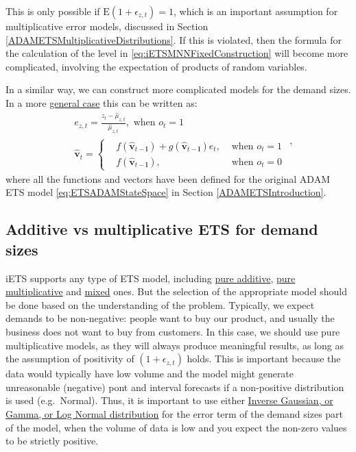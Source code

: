 \documentclass[
]{book}
\theoremstyle{definition}
\theoremstyle{definition}
\theoremstyle{definition}
\theoremstyle{definition}
\theoremstyle{remark}
\begin{document}
This is only possible if \(\mathrm{E}(1+\epsilon_{z,t})=1\), which is an important assumption for multiplicative error models, discussed in Section \ref{ADAMETSMultiplicativeDistributions}. If this is violated, then the formula for the calculation of the level in \eqref{eq:iETSMNNFixedConstruction} will become more complicated, involving the expectation of products of random variables.

In a similar way, we can construct more complicated models for the demand sizes. In a more \protect\hyperlink{ADAMETSIntroduction}{general case} this can be written as:
\begin{equation}
  \begin{aligned}
        & e_{z,t} = \frac{z_t - \hat{\mu}_{z,t}}{\hat{\mu}_{z,t}}, \text{ when } o_t=1 \\
        & \hat{\mathbf{v}}_{t} = 
            \left \lbrace \begin{aligned}
                & f(\hat{\mathbf{v}}_{t-\boldsymbol{l}}) + g(\hat{\mathbf{v}}_{t-\boldsymbol{l}}) e_t, & \text{ when } o_t=1 \\
                & f(\hat{\mathbf{v}}_{t-\boldsymbol{l}}) , & \text{ when } o_t=0
            \end{aligned} \right.
  \end{aligned},
  \label{eq:iETSADAMStateSpaceConstruction}
\end{equation}
where all the functions and vectors have been defined for the original ADAM ETS model \eqref{eq:ETSADAMStateSpace} in Section \ref{ADAMETSIntroduction}.

\hypertarget{additive-vs-multiplicative-ets-for-demand-sizes}{%
\subsection{Additive vs multiplicative ETS for demand sizes}\label{additive-vs-multiplicative-ets-for-demand-sizes}}

iETS supports any type of ETS model, including \protect\hyperlink{ADAMETSPureAdditive}{pure additive}, \protect\hyperlink{ADAMETSPureMultiplicative}{pure multiplicative} and \protect\hyperlink{ADAMETSMixedModels}{mixed} ones. But the selection of the appropriate model should be done based on the understanding of the problem. Typically, we expect demands to be non-negative: people want to buy our product, and usually the business does not want to buy from customers. In this case, we should use pure multiplicative models, as they will always produce meaningful results, as long as the assumption of positivity of \((1+\epsilon_{z,t})\) holds. This is important because the data would typically have low volume and the model might generate unreasonable (negative) pont and interval forecasts if a non-positive distribution is used (e.g.~Normal). Thus, it is important to use either \protect\hyperlink{ADAMETSMultiplicativeDistributions}{Inverse Gaussian, or Gamma, or Log Normal distribution} for the error term of the demand sizes part of the model, when the volume of data is low and you expect the non-zero values to be strictly positive.
\end{document}
